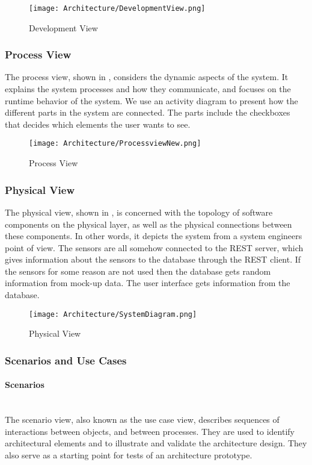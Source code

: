 \documentclass[../document.tex]{subfiles}
\begin{document}
\begin{figure}[H]
	\centering
	\texttt{[image: Architecture/DevelopmentView.png]}
	\caption{Development View}
	\label{fig:DevelopmentView}
\end{figure}

\subsubsection{Process View}
The process view, shown in , considers the dynamic aspects of the system. It explains the system processes and how they communicate, and focuses on the runtime behavior of the system. We use an activity diagram to present how the different parts in the system are connected. The parts include the checkboxes that decides which elements the user wants to see. 

\begin{figure}[H]
	\centering
	\texttt{[image: Architecture/ProcessviewNew.png]}
	\caption{Process View}
	\label{fig:ProcessView}
\end{figure}

\subsubsection{Physical View}
The physical view, shown in , is concerned with the topology of software components on the physical layer, as well as the physical connections between these components. In other words, it depicts the system from a system engineers point of view. The sensors are all somehow connected to the \gls{REST} server, which gives information about the sensors to the database through the \gls{REST} client. If the sensors for some reason are not used then the database gets random information from mock-up data. The user interface gets information from the database.

\begin{figure}[H]
	\centering
	\texttt{[image: Architecture/SystemDiagram.png]}
	\caption{Physical View}
	\label{fig:SystemDiagram}
\end{figure}

\subsubsection{Scenarios and Use Cases}
\paragraph{Scenarios} \ \\
The scenario view, also known as the use case view, describes sequences of interactions between objects, and between processes. They are used to identify architectural elements and to illustrate and validate the architecture design. They also serve as a starting point for tests of an architecture prototype.
\end{document}
